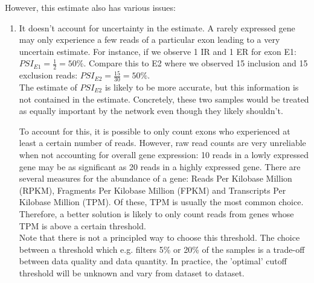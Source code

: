 However, this estimate also has various issues:
\begin{enumerate}[label=(\alph*)]
	\item It doesn't account for uncertainty in the estimate. A rarely expressed gene may only experience a few reads of a particular exon leading to a very uncertain estimate. For instance, if we observe 1 IR and 1 ER for exon E1: $PSI_{E1} = \frac{1}{2} = 50\%$. Compare this to E2 where we observed 15 inclusion and 15 exclusion reads: $PSI_{E2} = \frac{15}{30} = 50\%$.\\
	The estimate of $PSI_{E2}$ is likely to be more accurate, but this information is not contained in the estimate. Concretely, these two samples would be treated as equally important by the network even though they likely shouldn't.
	
	To account for this, it is possible to only count exons who experienced at least a certain number of reads. However, raw read counts are very unreliable when not accounting for overall gene expression: 10 reads in a lowly expressed gene may be as significant as 20 reads in a highly expressed gene. There are several measures for the abundance of a gene: Reads Per Kilobase Million (RPKM), Fragments Per Kilobase Million (FPKM) and Transcripts Per Kilobase Million (TPM). Of these, TPM is usually the most common choice. Therefore, a better solution is likely to only count reads from genes whose TPM is above a certain threshold. \\
	Note that there is not a principled way to choose this threshold. The choice between a threshold which e.g. filters 5\% or 20\% of the samples is a trade-off between data quality and data quantity. In practice, the 'optimal' cutoff threshold will be unknown and vary from dataset to dataset.


\end{enumerate}
